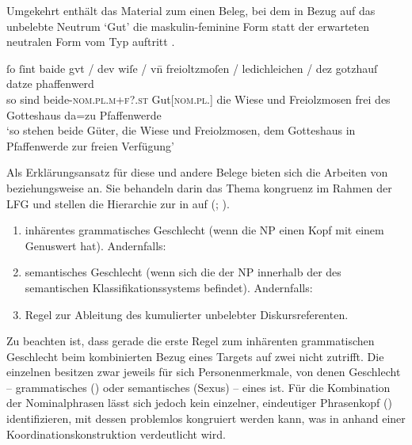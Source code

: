 Umgekehrt enthält das Material zum \CAO{} einen Beleg, bei dem in
Bezug auf das un\-belebte Neutrum  `Gut' die maskulin-feminine
Form  statt der erwarteten neutralen Form vom Typ 
auftritt .

\begin{exe}
\ex\label{ex:1584_gut2}
	\gll ſo ſint baide gvt / dev wiſe / vn̄ freioltzmoſen /
			ledichleichen / dez gotzhauſ datze phaffenwerd \\
		so sind beide-\textsc{nom.pl.m+f?\subI.st} Gut[\textsc{nom.pl.\NeutI}]
			{} die Wiese {} und Freiolzmosen {} frei {} des Gotteshaus da=zu
			Pfaffenwerde \\
	\trans `so stehen beide Güter, die Wiese und Freiolzmosen, dem Gotteshaus
		in Pfaffenwerde zur freien Verfügung'
		\parencites(Nr.~1584, Kl.~Herrenchiemsee, Kr.~Rosenheim, 1292)[727,26--27]{cao2}
\end{exe}

Als Erklärungsansatz für diese und andere Belege bieten sich die Arbeiten von
\citet[171--195]{wechslerzlatic2003} beziehungsweise \citet{wechsler2009} an.
Sie behandeln darin das Thema \-kongruenz im Rahmen der LFG
\autocites(vgl.~){bresnanetal2016} und stellen die
Hierarchie zur  in  auf (; \cites[584]{wechsler2009}[195]{wechslerzlatic2003}).

\begin{exe}
\ex\label{ex:gendasshier}
	\begin{enumerate}[noitemsep]
		\item inhärentes grammatisches Geschlecht (wenn die NP einen Kopf
			mit einem Genuswert hat). Andernfalls:
		\item semantisches Geschlecht (wenn sich die  der NP
			innerhalb der  des semantischen Klassifikationssystems
			befindet). Andernfalls:
		\item Regel zur Ableitung des  kumulierter unbelebter
			Diskursreferenten.
	\end{enumerate}
\end{exe}

Zu beachten ist, dass gerade die erste Regel zum inhärenten grammatischen
Geschlecht beim kombinierten Bezug eines Targets auf zwei 
nicht zutrifft. Die einzelnen  besitzen zwar jeweils für sich
Personenmerkmale, von denen Geschlecht -- grammatisches () oder
semantisches (Sexus) -- eines ist. Für die Kombination der Nominalphrasen lässt
sich jedoch kein einzelner, eindeutiger Phrasenkopf ()
identifizieren, mit dessen  problemlos
kongruiert werden kann, was in  anhand einer
Koordinations\-konstruktion verdeutlicht wird.


